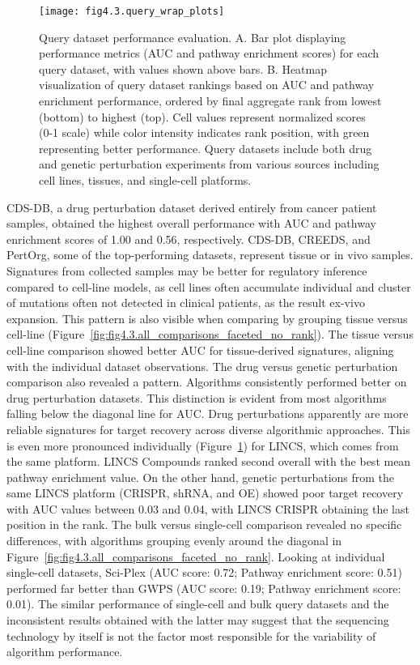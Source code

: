 \begin{figure}[htbp]
    \centering
    \texttt{[image: fig4.3.query\_wrap\_plots]}
    \caption[Query dataset performance evaluation.]{Query dataset performance evaluation. A. Bar plot displaying performance metrics (\gls{AUC} and pathway enrichment scores) for each query dataset, with values shown above bars. B. Heatmap visualization of query dataset rankings based on AUC and pathway enrichment performance, ordered by final aggregate rank from lowest (bottom) to highest (top). Cell values represent normalized scores (0-1 scale) while color intensity indicates rank position, with green representing better performance. Query datasets include both drug and genetic perturbation experiments from various sources including cell lines, tissues, and single-cell platforms.}
    \label{fig:fig4.3.query_wrap_plots}
\end{figure}

\gls{CDS-DB}, a drug perturbation dataset derived entirely from cancer patient samples, obtained the highest overall performance with \gls{AUC} and pathway enrichment scores of 1.00 and 0.56, respectively. CDS-DB, CREEDS, and PertOrg, some of the top-performing datasets, represent tissue or in vivo samples. Signatures from collected samples may be better for regulatory inference compared to cell-line models, as cell lines often accumulate individual and cluster of mutations often not detected in clinical patients, as the result ex-vivo expansion. This pattern is also visible when comparing by grouping tissue versus cell-line (Figure~\ref{fig:fig4.3.all_comparisons_faceted_no_rank}). The tissue versus cell-line comparison showed better \gls{AUC} for tissue-derived signatures, aligning with the individual dataset observations. The drug versus genetic perturbation comparison also revealed a pattern. Algorithms consistently performed better on drug perturbation datasets. This distinction is evident from most algorithms falling below the diagonal line for \gls{AUC}. Drug perturbations apparently are more reliable signatures for target recovery across diverse algorithmic approaches. This is even more pronounced individually (Figure~\ref{fig:fig4.3.query_wrap_plots}) for LINCS, which comes from the same platform. LINCS Compounds ranked second overall with the best mean pathway enrichment value. On the other hand, genetic perturbations from the same LINCS platform (\gls{CRISPR}, shRNA, and \gls{OE}) showed poor target recovery with \gls{AUC} values between 0.03 and 0.04, with LINCS CRISPR obtaining the last position in the rank. 
The bulk versus single-cell comparison revealed no specific differences, with algorithms grouping evenly around the diagonal in Figure~\ref{fig:fig4.3.all_comparisons_faceted_no_rank}. Looking at individual single-cell datasets, Sci-Plex (\gls{AUC} score: 0.72; Pathway enrichment score: 0.51) performed far better than GWPS (\gls{AUC} score: 0.19; Pathway enrichment score: 0.01). The similar performance of single-cell and bulk query datasets and the inconsistent results obtained with the latter may suggest that the sequencing technology by itself is not the factor most responsible for the variability of algorithm performance.


